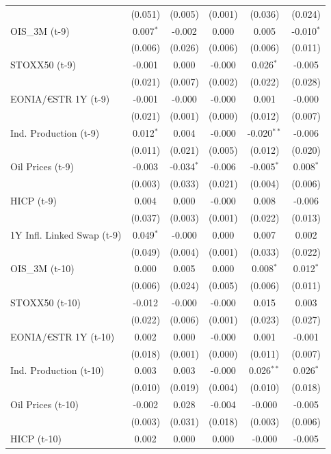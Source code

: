 \begin{longtable}[t]{lccccc}
 & (0.051) & (0.005) & (0.001) & (0.036) & (0.024)\\
OIS\_3M (t-9) & 0.007$^{*}$ & -0.002 & 0.000 & 0.005 & -0.010$^{*}$\\
 & (0.006) & (0.026) & (0.006) & (0.006) & (0.011)\\
STOXX50 (t-9) & -0.001 & 0.000 & -0.000 & 0.026$^{*}$ & -0.005\\
 & (0.021) & (0.007) & (0.002) & (0.022) & (0.028)\\
EONIA/€STR 1Y (t-9) & -0.001 & -0.000 & -0.000 & 0.001 & -0.000\\
 & (0.021) & (0.001) & (0.000) & (0.012) & (0.007)\\
Ind. Production (t-9) & 0.012$^{*}$ & 0.004 & -0.000 & -0.020$^{**}$ & -0.006\\
 & (0.011) & (0.021) & (0.005) & (0.012) & (0.020)\\
Oil Prices (t-9) & -0.003 & -0.034$^{*}$ & -0.006 & -0.005$^{*}$ & 0.008$^{*}$\\
 & (0.003) & (0.033) & (0.021) & (0.004) & (0.006)\\
HICP (t-9) & 0.004 & 0.000 & -0.000 & 0.008 & -0.006\\
 & (0.037) & (0.003) & (0.001) & (0.022) & (0.013)\\
1Y Infl. Linked Swap (t-9) & 0.049$^{*}$ & -0.000 & 0.000 & 0.007 & 0.002\\
 & (0.049) & (0.004) & (0.001) & (0.033) & (0.022)\\
OIS\_3M (t-10) & 0.000 & 0.005 & 0.000 & 0.008$^{*}$ & 0.012$^{*}$\\
 & (0.006) & (0.024) & (0.005) & (0.006) & (0.011)\\
STOXX50 (t-10) & -0.012 & -0.000 & -0.000 & 0.015 & 0.003\\
 & (0.022) & (0.006) & (0.001) & (0.023) & (0.027)\\
EONIA/€STR 1Y (t-10) & 0.002 & 0.000 & -0.000 & 0.001 & -0.001\\
 & (0.018) & (0.001) & (0.000) & (0.011) & (0.007)\\
Ind. Production (t-10) & 0.003 & 0.003 & -0.000 & 0.026$^{**}$ & 0.026$^{*}$\\
 & (0.010) & (0.019) & (0.004) & (0.010) & (0.018)\\
Oil Prices (t-10) & -0.002 & 0.028 & -0.004 & -0.000 & -0.005\\
 & (0.003) & (0.031) & (0.018) & (0.003) & (0.006)\\
HICP (t-10) & 0.002 & 0.000 & 0.000 & -0.000 & -0.005\\

\end{longtable}
